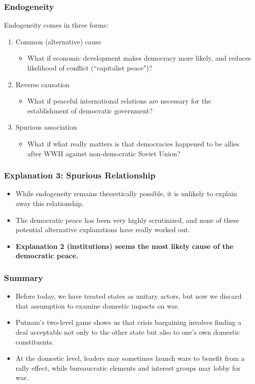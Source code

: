 \documentclass{beamer}
\begin{document}
\begin{frame} 
	\frametitle{\LARGE{Endogeneity}}
Endogeneity comes in three forms:
	\begin{enumerate}
		\item Common (alternative) cause \pause
		\begin{itemize}
			\item What if economic development makes democracy more likely, and reduces likelihood of conflict (``capitalist peace")?
		\end{itemize}
		\item Reverse causation \pause
		\begin{itemize}
			\item What if peaceful international relations are necessary for the establishment of democratic government?
		\end{itemize}
			\item Spurious association \pause
		\begin{itemize}
			\item What if what really matters is that democracies happened to be allies after WWII against non-democratic Soviet Union?
		\end{itemize}
	\end{enumerate}
\end{frame}

\begin{frame} 
	\frametitle{\LARGE{Explanation 3: Spurious Relationship}}
	\begin{itemize}
		\item While endogeneity remains theoretically possible, it is unlikely to explain away this relationship.
		\item The democratic peace has been very highly scrutinized, and none of these potential alternative explanations have really worked out. \pause
		\item \textbf{Explanation 2 (institutions) seems the most likely cause of the democratic peace.}
	\end{itemize}
\end{frame}

\begin{frame} 
	\frametitle{\LARGE{Summary}}
	\begin{itemize}
		\item Before today, we have treated states as unitary actors, but now we discard that assumption to examine domestic impacts on war.
		\item Putnam's two-level game shows us that crisis bargaining involves finding a deal acceptable not only to the other state but also to one's own domestic constituents.
		\item At the domestic level, leaders may sometimes launch wars to benefit from a rally effect, while bureaucratic elements and interest groups may lobby for war. 
	\end{itemize}
\end{frame}
\end{document}
